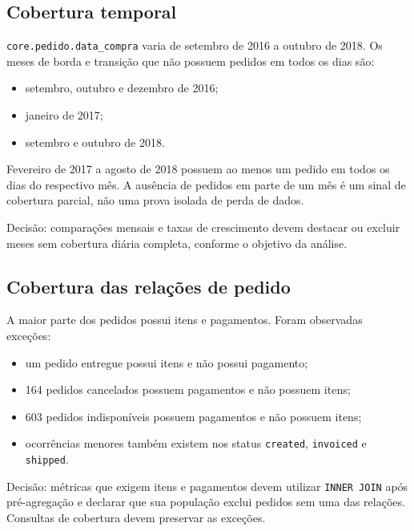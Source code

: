 \documentclass[12pt,a4paper]{article}
\providecommand{\tightlist}{
  \setlength{\itemsep}{0pt}\setlength{\parskip}{0pt}
}
\begin{document}
\subsection{Cobertura
temporal}\label{docs__analytics__evidencias_consultas_basicas_core.md__cobertura-temporal}

\nolinkurl{core.pedido.data_compra} varia de setembro de 2016 a outubro
de 2018. Os meses de borda e transição que não possuem pedidos em todos
os dias são:

\begin{itemize}
\tightlist
\item
  setembro, outubro e dezembro de 2016;
\item
  janeiro de 2017;
\item
  setembro e outubro de 2018.
\end{itemize}

Fevereiro de 2017 a agosto de 2018 possuem ao menos um pedido em todos
os dias do respectivo mês. A ausência de pedidos em parte de um mês é um
sinal de cobertura parcial, não uma prova isolada de perda de dados.

Decisão: comparações mensais e taxas de crescimento devem destacar ou
excluir meses sem cobertura diária completa, conforme o objetivo da
análise.

\subsection{Cobertura das relações de
pedido}\label{docs__analytics__evidencias_consultas_basicas_core.md__cobertura-das-relauxe7uxf5es-de-pedido}

A maior parte dos pedidos possui itens e pagamentos. Foram observadas
exceções:

\begin{itemize}
\tightlist
\item
  um pedido entregue possui itens e não possui pagamento;
\item
  164 pedidos cancelados possuem pagamentos e não possuem itens;
\item
  603 pedidos indisponíveis possuem pagamentos e não possuem itens;
\item
  ocorrências menores também existem nos status \nolinkurl{created},
  \nolinkurl{invoiced} e \nolinkurl{shipped}.
\end{itemize}

Decisão: métricas que exigem itens e pagamentos devem utilizar
\nolinkurl{INNER JOIN} após pré-agregação e declarar que sua população
exclui pedidos sem uma das relações. Consultas de cobertura devem
preservar as exceções.
\end{document}
